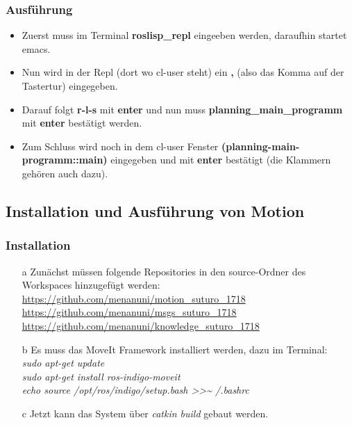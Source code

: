 \documentclass{suturo}
\begin{document}
\subsubsection{Ausführung}
\begin{itemize}

\item Zuerst muss im Terminal \textbf{roslisp\_repl} eingeeben werden, daraufhin startet emacs. 

\item Nun wird in der Repl (dort wo cl-user steht) ein \textbf{,} (also das Komma auf der Tastertur) eingegeben.

\item Darauf folgt \textbf{r-l-s} mit \textbf{enter} und nun muss \textbf{planning\_main\_programm} mit \textbf{enter} bestätigt werden.

\item Zum Schluss wird noch in dem cl-user Fenster \textbf{(planning-main-programm::main)} eingegeben und mit \textbf{enter} bestätigt (die Klammern gehören auch dazu).
\end{itemize}


\subsection{Installation und Ausführung von Motion}

\subsubsection{Installation}
\begin{itemize}


\item[a] Zunächst müssen folgende Repositories in den source-Ordner des Workspaces hinzugefügt werden:  \\
\url{https://github.com/menanuni/motion_suturo_1718} \\
\url{https://github.com/menanuni/msgs_suturo_1718} \\
\url{https://github.com/menanuni/knowledge_suturo_1718} \\

\item[b] Es muss das MoveIt Framework installiert werden, dazu im Terminal: \\
\textit{sudo apt-get update} \\
\textit{sudo apt-get install ros-indigo-moveit} \\
\textit{echo  \grqq{}source /opt/ros/indigo/setup.bash\grqq{} \textgreater\textgreater \textasciitilde{ }/.bashrc} \\

\item[c] Jetzt kann das System über \textit{catkin build} gebaut werden.

\end{itemize}
\end{document}
